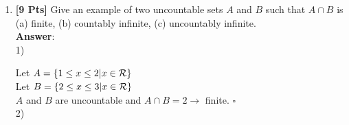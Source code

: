 \documentclass[11pt]{article}
\begin{document}
\begin{enumerate}
\begin{enumerate}
$f: \cal N \times \cal N$ $\rightarrow \cal S:$ $(n,m) \rightarrow \sum_{i=1}^{n} 10^i + \sum_{i=1}^{m} \frac{1}{10^i}$\\

$(n,m)$ maps to $n$ $1's$ to the left of the dot and $m$ $1's$ of the right side. $f$ is a bijection, $\cal N \times \cal N$ is countable and $\cal S$ is countable therefore $A$ is also countable.\\\\

\item {\bf [8 Pts]} the set of real numbers with decimal representation
  consisting of 1's and 9's\\
\textbf{Answer}:\\ \\
Let us enumerate the values between $0$ and $1$.\\

$0.\textbf{1}111111191199...$\\
$0.9\textbf{1}19191199191... $\\
$0.19\textbf{9}9119199119... $\\
$0.199\textbf{1}111911911... $\\
$0.9191\textbf{9}19199111... $\\
$0.91919\textbf{1}1911199... $\\
$...$\\

Taking the numbers bolded we get $0.119191$. This could not appear in our list because it would differ by at least one digit. We could not possibly enumerate all of the values between $0$ and $1$, so this set in uncountable. 

\end{enumerate}


\item {\bf [9 Pts]} Give an example of two uncountable sets $A$ and $B$ such that $A \cap B$ is (a) finite, (b) countably infinite, (c) uncountably infinite.\\ 
\textbf{Answer}:\\

1)

Let $A = \{ 1 \leq x \leq 2 | x \in \cal R \}$\\
Let $B = \{ 2 \leq x \leq 3 | x \in \cal R \}$\\

$A$ and $B$ are uncountable and $A \cap B = 2 \rightarrow$ finite. $\square$ \\

2)


\end{enumerate}
\end{document}
